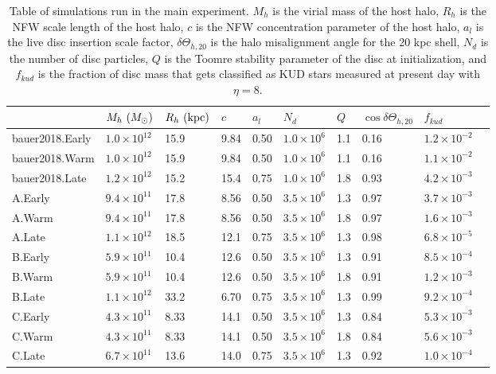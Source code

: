 \begin{table}
\centering
\caption{Table of simulations run in the main experiment. $M_h$ is the virial mass of the host halo, $R_h$ is the NFW scale length of the host halo, $c$ is the NFW concentration parameter of the host halo, $a_l$ is the live disc insertion scale factor, $\delta \Theta_{h,20}$ is the halo misalignment angle for the 20 kpc shell, $N_d$ is the number of disc particles,  $Q$ is the Toomre stability parameter of the disc at initialization, and $f_{kud}$ is the fraction of disc mass that gets classified as KUD stars measured at present day with $\eta=8$.} \label{tab:sims}
\begin{tabular}{l l l l l l l l l l}
\hline
       & $M_h\,\,(M_\odot)$ & $R_h\,\,(\text{kpc})$ & $c$ & $a_l$ &  $N_d$ & $Q$ & $\cos\delta \Theta_{h,20}$ & $f_{kud}$\\
\hline
bauer2018.Early   & $1.0 \times 10^{12}$ & 15.9 &  9.84 &   0.50 & $1.0 \times 10^6$ & 1.1 & 0.16 & $1.2 \times 10^{-2}$\\
bauer2018.Warm    & $1.0 \times 10^{12}$ & 15.9 &  9.84 &   0.50 & $1.0 \times 10^6$ & 1.1 & 0.16 & $1.1 \times 10^{-2}$\\
bauer2018.Late    & $1.2 \times 10^{12}$ & 15.2 &  15.4 &   0.75 & $1.0 \times 10^6$ & 1.8 & 0.93 &$4.2 \times 10^{-3}$\\
A.Early           & $9.4 \times 10^{11}$ & 17.8 &  8.56 &   0.50 & $3.5 \times 10^6$ & 1.3 & 0.97 &$3.7 \times 10^{-3}$\\
A.Warm            & $9.4 \times 10^{11}$ & 17.8 &  8.56 &   0.50 & $3.5 \times 10^6$ & 1.8 & 0.97 & $1.6 \times 10^{-3}$\\
A.Late            & $1.1 \times 10^{12}$ & 18.5 &  12.1 &   0.75 & $3.5 \times 10^6$ & 1.3 & 0.98 & $6.8 \times 10^{-5}$\\
B.Early           & $5.9 \times 10^{11}$ & 10.4 &  12.6 &   0.50 & $3.5 \times 10^6$ & 1.3 & 0.91 & $8.5 \times 10^{-4}$\\
B.Warm            & $5.9 \times 10^{11}$ & 10.4 &  12.6 &   0.50 & $3.5 \times 10^6$ & 1.8 & 0.91 & $1.2 \times 10^{-3}$\\
B.Late            & $1.1 \times 10^{12}$ & 33.2 &  6.70 &   0.75 & $3.5 \times 10^6$ & 1.3 & 0.99 & $9.2 \times 10^{-4}$\\
C.Early           & $4.3 \times 10^{11}$ & 8.33 &  14.1 &   0.50 & $3.5 \times 10^6$ & 1.3 & 0.84 & $5.3 \times 10^{-3}$\\
C.Warm            & $4.3 \times 10^{11}$ & 8.33 &  14.1 &   0.50 & $3.5 \times 10^6$ & 1.8 & 0.84 & $5.6 \times 10^{-3}$\\
C.Late            & $6.7 \times 10^{11}$ & 13.6 &  14.0 &   0.75 & $3.5 \times 10^6$ & 1.3 & 0.92 & $1.0 \times 10^{-4}$\\
\hline
\end{tabular} 

\end{table}

